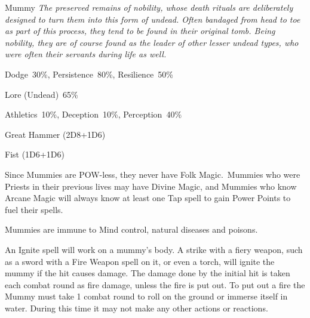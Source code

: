 \begin{monsterbox}{Mummy}
	\textit{The preserved remains of nobility, whose death rituals are deliberately designed to turn them into this form of undead. Often bandaged from head to toe as part of this process, they tend to be found in their original tomb. Being nobility, they are of course found as the leader of other lesser undead types, who were often their servants during life as well.}\\
	\rpghline
	\basics[%
        hitpoints  = 18,
	majorwound = 9,
	damagemodifier = +1D6,
	powerpoints = 0,
	movementrate = 15m,
	armor = Tough Skin (2AP),
	plunderrating = 4
	]
	\rpghline%
	\stats[ %
		STR = 3D6+12 (23),
		CON = 3D6+12 (23),
		DEX = 2D6    (4),
		SIZ = 2D6+6  (13),
		INT = 2D6+6  (13),
		POW = 0      (0),
		CHA = 1      (1)
	]
	\rpghline%
	\begin{rpg-monsteraction}[Resistances]
		Dodge~30\%, Persistence~80\%, Resilience~50\%
	\end{rpg-monsteraction}
	\begin{rpg-monsteraction}[Knowledge]
		Lore (Undead)~65\%
	\end{rpg-monsteraction}
	\begin{rpg-monsteraction}[Practical]
		Athletics~10\%, Deception~10\%, Perception~40\%
	\end{rpg-monsteraction}
	\begin{rpg-monsteraction}
		Great Hammer (2D8+1D6)
	\end{rpg-monsteraction}
	\begin{rpg-monsteraction}
		Fist (1D6+1D6)
	\end{rpg-monsteraction}
	\begin{rpg-monsteraction}[Magic]
		Since Mummies are POW-less, they never have Folk Magic. Mummies who were Priests in their previous lives may have Divine Magic, and Mummies who know Arcane Magic will always know at least one Tap spell to gain Power Points to fuel their spells.
	\end{rpg-monsteraction}
	\begin{rpg-monsteraction}[Immunities]
		Mummies are immune to Mind control, natural diseases and poisons.
	\end{rpg-monsteraction}
	\begin{rpg-monsteraction}[Flammable]
		An Ignite spell will work on a mummy’s body. A strike with a fiery weapon, such as a sword with a Fire Weapon spell on it, or even a torch, will ignite the mummy if the hit causes damage. The damage done by the initial hit is taken each combat round as fire damage, unless the fire is put out. To put out a fire the Mummy must take 1 combat round to roll on the ground or immerse itself in water. During this time it may not make any other actions or reactions.

\end{rpg-monsteraction}
\end{monsterbox}
